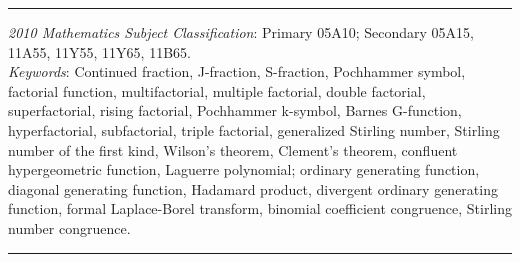 \documentclass[12pt,reqno]{article}
\numberwithin{sfootnote}{section}
\numberwithin{equation}{section}
\theoremstyle{DefaultTheoremStyle}
\theoremstyle{definition}
\begin{document}
\bigskip\hrule\bigskip 
\noindent 
\textit{2010 Mathematics Subject Classification}: 
Primary 05A10; Secondary 05A15, 11A55, 11Y55, 11Y65, 11B65. \\ 
\textit{Keywords}: 
Continued fraction, J-fraction, S-fraction, 
Pochhammer symbol, factorial function, 
multifactorial, multiple factorial, 
double factorial, superfactorial, 
rising factorial, Pochhammer k-symbol, 
Barnes G-function, hyperfactorial, subfactorial, triple factorial, 
generalized Stirling number, Stirling number of the first kind, 
Wilson's theorem, Clement's theorem, 
confluent hypergeometric function, Laguerre polynomial; 
ordinary generating function, diagonal generating function, 
Hadamard product, divergent ordinary generating function, 
formal Laplace-Borel transform, 
binomial coefficient congruence, Stirling number congruence. 

\bigskip\hrule\bigskip 
\end{document}
